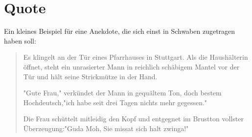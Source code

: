 \section{Quote}
	Ein kleines Beispiel für eine Anekdote, die sich einst in Schwaben zugetragen haben soll:
\begin{quote}
	Es klingelt an der Tür eines Pfarrhauses in Stuttgart. Als die Haushälterin öffnet, steht ein unrasierter Mann in reichlich schäbigem Mantel vor der Tür und hält seine Strickmütze in der Hand.
	
	"Gute Frau," verkündet der Mann in gequältem Ton, doch bestem Hochdeutsch,"ich habe seit drei Tagen nichts mehr gegessen."
	
	Die Frau schüttelt mitleidig den Kopf und entgegnet im Brustton vollster Überzeugung:"Guda Moh, Sie missat sich halt zwinga!"
\end{quote}


